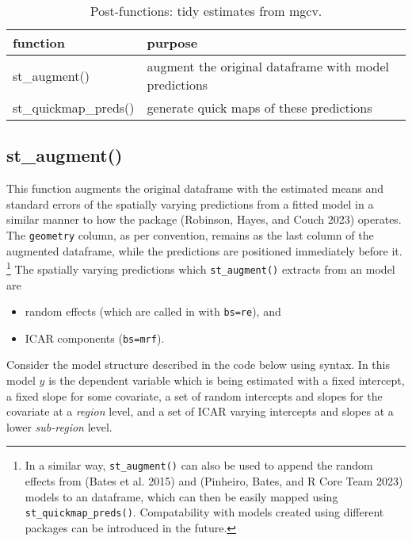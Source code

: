 \begin{table}

\caption{\label{tab:postfunc-latex}Post-functions: tidy estimates from mgcv.}
\centering
\fontsize{9}{11}\selectfont
\begin{tabular}[t]{l|l}
\hline
\textbf{function} & \textbf{purpose}\\
\hline
st\_augment() & augment the original dataframe with model predictions\\
\hline
st\_quickmap\_preds() & generate quick maps of these predictions\\
\hline
\end{tabular}
\end{table}

\hypertarget{st_augment}{%
\subsection{st\_augment()}\label{st_augment}}

This function augments the original dataframe with the estimated means
and standard errors of the spatially varying predictions from a fitted  model in a similar manner to
how the  package (Robinson, Hayes, and Couch 2023) operates. The \texttt{geometry} column, as per convention, remains as the last column of the augmented dataframe, while the predictions are positioned immediately before it. \footnote{In a similar way, \texttt{st\_augment()} can also be used to append the random effects from  (Bates et al. 2015) and  (Pinheiro, Bates, and R Core Team 2023) models to an  dataframe, which can then be easily mapped using \texttt{st\_quickmap\_preds()}. Compatability with models created using different packages can be introduced in the future.} The spatially varying predictions which \texttt{st\_augment()} extracts from an  model are

\begin{itemize}
\tightlist
\item
  random effects (which are called in  with \texttt{bs=\textquotesingle{}re\textquotesingle{}}), and
\item
  ICAR components (\texttt{bs=\textquotesingle{}mrf\textquotesingle{}}).
\end{itemize}

Consider the model structure described in the code below using  syntax. In this model \(y\) is the dependent variable which is being estimated with a fixed intercept, a fixed slope for some covariate, a set of random intercepts and slopes for the covariate at a \emph{region} level, and a set of ICAR varying intercepts and slopes at a lower \emph{sub-region} level.

